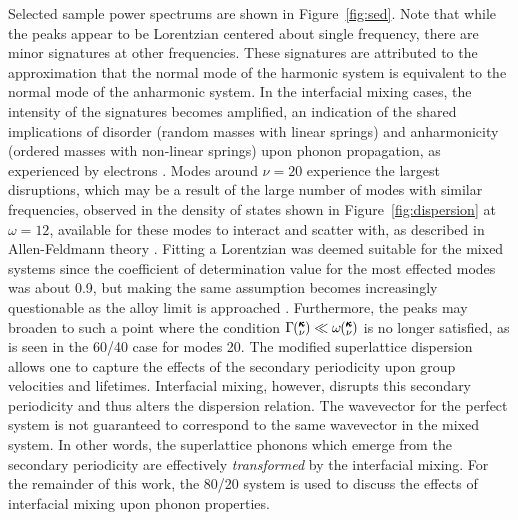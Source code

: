 \documentclass[aps,prb,preprint,preprintnumbers,amsmath,amssymb,floatfix,superscriptaddress]{revtex4}
\newcommand{\kv}{\mspace{-4.0mu}\left(\mspace{-8.0mu}
\begin{smallmatrix}&\pmb{\kappa} \\&\nu\end{smallmatrix}
\mspace{-3.0mu}\right)}
\begin{document}
Selected sample power spectrums are shown in Figure~\ref{fig:sed}. Note that while the peaks appear to be Lorentzian centered about single frequency, there are minor signatures at other frequencies. These signatures are attributed to the approximation that the normal mode of the harmonic system is equivalent to the normal mode of the anharmonic system. In the interfacial mixing cases, the intensity of the signatures becomes amplified, an indication of the shared implications of disorder (random masses with linear springs) and anharmonicity (ordered masses with non-linear springs) \cite{RevModPhys.53.175} upon phonon propagation, as experienced by electrons \cite{mott1961theory}. Modes around $\nu=20$ experience the largest disruptions, which may be a result of the large number of modes with similar frequencies, observed in the density of states shown in Figure~\ref{fig:dispersion} at $\omega=12$, available for these modes to interact and scatter with, as described in Allen-Feldmann theory \cite{allen_thermal_1993,feldman_thermal_1993-1}. Fitting a Lorentzian was deemed suitable for the mixed systems since the coefficient of determination value \cite{Cowpe20081066} for the most effected modes was about 0.9, but making the same assumption becomes increasingly questionable as the alloy limit is approached \cite{jason2013vc}. Furthermore, the peaks may broaden to such a point where the condition $\Gamma\kv \ll \omega\kv$ is no longer satisfied, as is seen in the 60/40 case for modes 20. The modified superlattice dispersion allows one to capture the effects of the secondary periodicity upon group velocities and lifetimes. Interfacial mixing, however, disrupts this secondary periodicity and thus alters the dispersion relation. The wavevector for the perfect system is not guaranteed to  correspond to the same wavevector in the mixed system. In other words, the superlattice phonons which emerge from the secondary periodicity are effectively \textit{transformed} by the interfacial mixing. For the remainder of this work, the 80/20 system is used to discuss the effects of interfacial mixing upon phonon properties.
\begin{figure*}%
\begin{center}
\renewcommand{\figure}{Fig.}
\caption{(Colour online) Plots of the power spectrums for the selected modes as indicated by the red square markers in the left frame of Figure~\ref{fig:dispersion}. Dark blue corresponds to a superlattice without mixing, red corresponds to mixing of 80/20 and light blue corresponds to mixing of 60/40. Lifetimes calculated from the fitting of the Lorentzian functions (not shown) for the three systems are presented.}
\label{fig:sed}
\end{center}
\end{figure*}
\end{document}
